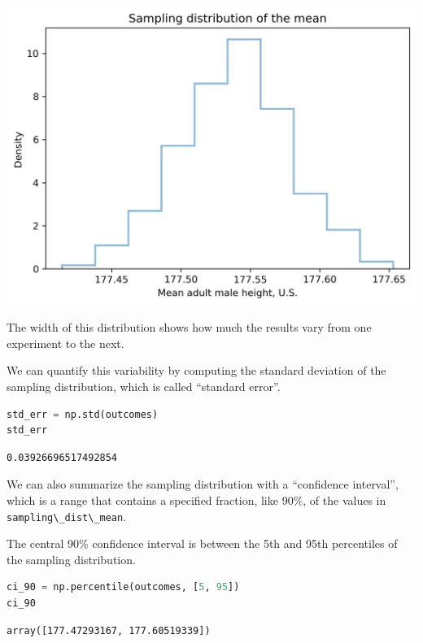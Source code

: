 \begin{center}
\includegraphics[scale=0.75]{11_inference_files/11_inference_105_0.png}
\end{center}

The width of this distribution shows how much the results vary from one
experiment to the next.

We can quantify this variability by computing the standard deviation of
the sampling distribution, which is called ``standard error''.

\begin{lstlisting}[language=Python,style=source]
std_err = np.std(outcomes)
std_err
\end{lstlisting}

\begin{lstlisting}[style=output]
0.03926696517492854
\end{lstlisting}

We can also summarize the sampling distribution with a ``confidence
interval'', which is a range that contains a specified fraction, like
90\%, of the values in \passthrough{\lstinline!sampling\_dist\_mean!}.

The central 90\% confidence interval is between the 5th and 95th
percentiles of the sampling distribution.

\begin{lstlisting}[language=Python,style=source]
ci_90 = np.percentile(outcomes, [5, 95])
ci_90
\end{lstlisting}

\begin{lstlisting}[style=output]
array([177.47293167, 177.60519339])
\end{lstlisting}

